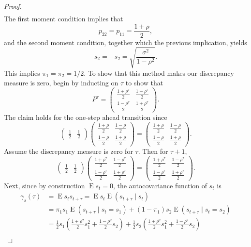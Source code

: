 \documentclass[oneside,reqno]{amsart}
\DeclareMathOperator{\E}{E}
\theoremstyle{definition}
\begin{document}
\begin{enumerate}[label=(\roman*)]
\begin{proof}
\begin{align*}
\end{align*}
The first moment condition implies that 
\[
	p_{22} = p_{11} = \frac{1+\rho}{2},
\]
and the second moment condition, together which the previous implication, yields 
\[
	s_2 = -s_2 = \sqrt{\frac{\sigma^2}{1-\rho^2}}.
\]
This implies $\pi_1 = \pi_2 = 1/2$. To show that this method makes our discrepancy measure is zero, begin by inducting on $\tau$ to show that
\[
	P^\tau = \begin{pmatrix}
		\frac{1+\rho^\tau}{2} & \frac{1- \rho^\tau}{2} \\
		\frac{1-\rho^\tau}{2} & \frac{1+ \rho^\tau}{2}
	\end{pmatrix}.
\] 
The claim holds for the one-step ahead transition since
\[
	\begin{pmatrix}
		\frac{1}{2} & \frac{1}{2}
	\end{pmatrix}
	\begin{pmatrix}
		\frac{1+\rho}{2} & \frac{1- \rho}{2} \\
		\frac{1-\rho}{2} & \frac{1+ \rho}{2}
	\end{pmatrix}
	=\begin{pmatrix}
		\frac{1+\rho}{2} & \frac{1- \rho}{2} \\
		\frac{1-\rho}{2} & \frac{1+ \rho}{2}
	\end{pmatrix}.
\]
Assume the discrepancy measure is zero for $\tau$. Then for $\tau+1$,
\[
	\begin{pmatrix}
		\frac{1}{2} & \frac{1}{2}
	\end{pmatrix}
	\begin{pmatrix}
		\frac{1+\rho^\tau}{2} & \frac{1- \rho^\tau}{2} \\
		\frac{1-\rho^\tau}{2} & \frac{1+ \rho^\tau}{2}
	\end{pmatrix}
	=\begin{pmatrix}
		\frac{1+\rho^\tau}{2} & \frac{1- \rho^\tau}{2} \\
		\frac{1-\rho^\tau}{2} & \frac{1+ \rho^\tau}{2}
	\end{pmatrix}.
\]
Next, since by construction $\E s_t = 0$, the autocovariance function of $s_t$ is 
\begin{align*}
	\gamma_s(\tau) &= \E s_ts_{t+\tau} = \E s_t \E (s_{t+\tau} \mid s_t) \\
		&= \pi_1 s_1 \E (s_{t+\tau} \mid s_t = s_1) +  (1-\pi_1) s_2 \E (s_{t+\tau} \mid s_t = s_2) \\
		&= \frac{1}{2} s_1 \left(\frac{1+\rho^2}{2} s_1^2 + \frac{1-\rho^2}{2} s_2\right) + \frac{1}{2} s_2 \left(\frac{1+\rho^2}{2} s_1^2 + \frac{1-\rho^2}{2} s_2 \right) \\

\end{align*}
\end{proof}
\end{enumerate}
\end{document}
